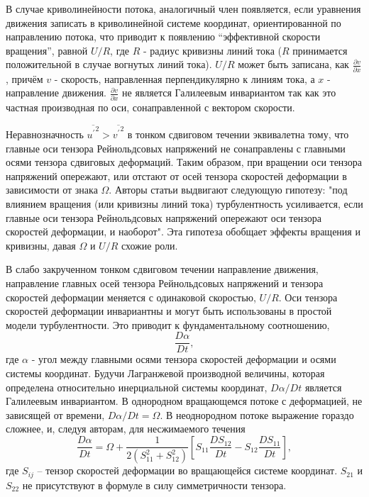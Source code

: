 		В случае криволинейности потока, аналогичный член появляется, если уравнения движения записать в криволинейной системе координат, ориентированной по направлению потока, что приводит к появлению ``эффективной скорости вращения'', равной $U/R$, где $R$ - радиус кривизны линий тока ($R$ принимается положительной в случае вогнутых линий тока). $U/R$ может быть записана, как $\frac{\partial v}{\partial x}$, причём $v$ - скорость, направленная перпендикулярно к линиям тока, а $x$ - направление движения. $\frac{\partial v}{\partial x}$ не является Галилеевым инвариантом так как это частная производная по оси, сонаправленной с вектором скорости.
		
		Неравнозначность $\overline{{u^{'}}^2} > \overline{{v^{'}}^2}$ в тонком сдвиговом течении эквивалетна тому, что главные оси тензора Рейнольдсовых напряжений не сонаправлены с главными осями тензора сдвиговых деформаций. Таким образом, при вращении оси тензора напряжений опережают, или отстают от осей тензора скоростей деформации в зависимости от знака $\Omega$. Авторы статьи выдвигают следующую гипотезу: "под влиянием вращения (или кривизны линий тока) турбулентность усиливается, если главные оси тензора Рейнольдсовых напряжений опережают оси тензора скоростей деформации, и наоборот". Эта гипотеза обобщает эффекты вращения и кривизны, давая $\Omega$ и $U/R$ схожие роли.
		
		В слабо закрученном тонком сдвиговом течении направление движения, направление главных осей тензора Рейнольдсовых напряжений и тензора скоростей деформации меняется с одинаковой скоростью, $U/R$. Оси тензора скоростей деформации инвариантны и могут быть использованы в простой модели турбулентности. Это приводит к фундаментальному соотношению, 
		$$
			\frac{D\alpha}{Dt},
		$$
		где $\alpha$ - угол между главными осями тензора скоростей деформации и осями системы координат. Будучи Лагранжевой производной величины, которая определена относительно инерциальной системы координат, $D\alpha/Dt$ является Галилеевым инвариантом. В однородном вращающемся потоке с деформацией, не зависящей от времени, $D\alpha/Dt = \Omega$. В неоднородном потоке выражение гораздо сложнее, и, следуя авторам, для несжимаемого течения
		\begin{equation}
			\frac{D\alpha}{Dt} = \Omega + \frac{1}{2\left( S_{11}^2 + S_{12}^2 \right)} \left[ S_{11} \frac{DS_{12}}{Dt} - S_{12} \frac{DS_{11}}{Dt} \right],
		\end{equation}
		где $S_{ij}$ -- тензор скоростей деформации во вращающейся системе координат. $S_{21}$ и $S_{22}$ не присутствуют в формуле в силу симметричности тензора.
		
